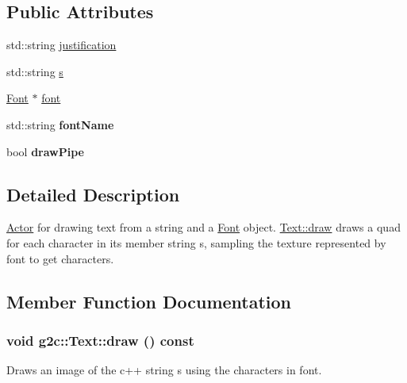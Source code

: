\subsection*{Public Attributes}
\begin{DoxyCompactItemize}
\item 
std::string \hyperlink{classg2c_1_1_text_a0b1d9a8876fced2290eeda161d992084}{justification}
\item 
std::string \hyperlink{classg2c_1_1_text_a9b4447b44f0831b3f40ef12ebac60dc1}{s}
\item 
\hyperlink{classg2c_1_1_font}{Font} $\ast$ \hyperlink{classg2c_1_1_text_a1bb9fa51e3d58a6561d4449495d3ce75}{font}
\item 
\hypertarget{classg2c_1_1_text_a5bca37a540e7ad2d8b5f2b940473c9ac}{
std::string {\bfseries fontName}}
\label{classg2c_1_1_text_a5bca37a540e7ad2d8b5f2b940473c9ac}

\item 
\hypertarget{classg2c_1_1_text_ae352a66b9303fb1a742ce39c06a8c063}{
bool {\bfseries drawPipe}}
\label{classg2c_1_1_text_ae352a66b9303fb1a742ce39c06a8c063}

\end{DoxyCompactItemize}


\subsection{Detailed Description}
\hyperlink{classg2c_1_1_actor}{Actor} for drawing text from a string and a \hyperlink{classg2c_1_1_font}{Font} object. \hyperlink{classg2c_1_1_text_ab3296a30652c4c3157ae8a8e87449bb4}{Text::draw} draws a quad for each character in its member string s, sampling the texture represented by font to get characters. 

\subsection{Member Function Documentation}
\hypertarget{classg2c_1_1_text_ab3296a30652c4c3157ae8a8e87449bb4}{
\subsubsection[{draw}]{\setlength{\rightskip}{0pt plus 5cm}void g2c::Text::draw () const}}
\label{classg2c_1_1_text_ab3296a30652c4c3157ae8a8e87449bb4}
Draws an image of the c++ string s using the characters in font. 

